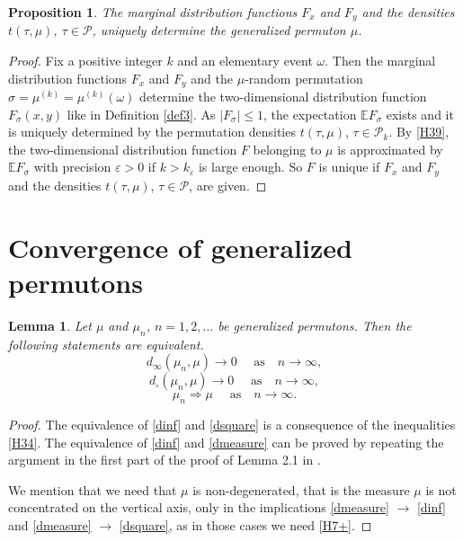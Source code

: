 \documentclass[12pt,twoside]{article}
\theoremstyle{definition}
\theoremstyle{remark}
\numberwithin{equation}{section}
\theoremstyle{plain}
\newtheorem{prop}{Proposition}[section]
\newtheorem{lem}{Lemma}[section]
\theoremstyle{remark}
\def\E{{\mathbb {E}}}                       \def\D{{\mathbb {D}}}
\def\PD{{\mathcal P}}                     \def\PDW{{\tilde{\cal P}}}
\def\PD{{\mathcal P}}
\begin{document}
\begin{prop}  \label{HLemma5.1}
The marginal distribution functions $F_x$ and $F_y$ and the densities
$t(\tau, \mu)$, $\tau \in \PD$, uniquely determine the generalized permuton $\mu$.
\end{prop}
%

\begin{proof}
Fix a positive integer $k$ and an elementary event $\omega$.
Then the marginal distribution functions $F_x$ and $F_y$ and the 
$\mu$-random permutation $\sigma = \mu^{(k)} =\mu^{(k)}(\omega)$ 
determine the two-dimensional distribution function $F_{\sigma}(x,y)$ like in 
Definition \ref{def3}.
As $|F_{\sigma}| \le 1$, the expectation $\E F_{\sigma}$ exists and it is uniquely determined by
the permutation densities $t(\tau, \mu)$, $\tau \in \PD_k$.
By \eqref{H39}, the two-dimensional distribution function $F$ belonging to $\mu$
is approximated by $\E F_{\sigma}$ with precision $\varepsilon>0$ if $k> k_\varepsilon$ is large enough.
So $F$ is unique if $F_x$ and $F_y$ and the densities
$t(\tau, \mu)$, $\tau \in \PD$, are given.
\end{proof}
%

\section{Convergence of generalized permutons} \label{convergences}
\setcounter{equation}{0}
%

\begin{lem}  \label{lem41}
Let $\mu$  and $\mu_n$, $n=1,2, \dots$ be  generalized permutons.
Then the following statements are equivalent.
\begin{equation} \label{dinf}
d_\infty(\mu_n,\mu) \to 0 \quad \text{ as} \quad n\to \infty,
\end{equation}
\begin{equation} \label{dsquare}
d_\square(\mu_n,\mu) \to 0 \quad \text{ as} \quad n\to \infty,
\end{equation}
\begin{equation} \label{dmeasure}
\mu_n \Rightarrow \mu \quad \text{ as} \quad n\to \infty.
\end{equation}
\end{lem}
%

\begin{proof}
The equivalence of \eqref{dinf} and \eqref{dsquare} is a consequence of the inequalities
\eqref{H34}.
The equivalence of \eqref{dinf} and \eqref{dmeasure} can be proved by repeating the argument in
the first part of the proof of Lemma 2.1 in \cite{Hoppen}.

We mention that we need that $\mu$ is non-degenerated, 
that is the measure $\mu$ is not concentrated on the vertical axis, only in the implications 
 \eqref{dmeasure} $\rightarrow$ \eqref{dinf} and
\eqref{dmeasure} $\rightarrow$ \eqref{dsquare}, as in those cases we need \eqref{H7+}.
\end{proof}
%
\end{document}
